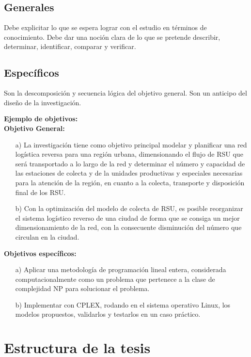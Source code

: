 \subsection{Generales}
Debe explicitar lo que se espera lograr con el estudio en términos de conocimiento. Debe dar una noción clara de lo que se pretende describir, determinar, identificar, comparar y verificar.


\subsection{Específicos}
Son la descomposición y secuencia lógica del objetivo general. Son un anticipo del diseño de la investigación.
\vskip 0.3cm



{\bf Ejemplo de objetivos:}\\
{\bf Objetivo General:}
\begin{enumerate}
\item[a)] La investigación tiene como objetivo principal modelar y planificar una red logística reversa para una región urbana, dimensionando el flujo de RSU que será transportado a lo largo de la red y determinar el número y capacidad de las estaciones de colecta y de la unidades productivas y especiales necesarias para la atención de la región, en cuanto a la colecta, transporte y disposición final de los RSU.
\vskip 0.3cm
\item[b)]Con la optimización del modelo de colecta de RSU, es posible reorganizar el sistema logístico reverso de una ciudad de forma que se consiga un mejor dimensionamiento de la red, con la consecuente disminución del número que circulan en la ciudad.
\end{enumerate}
\vskip 0.2cm
{\bf Objetivos específicos:}
\begin{enumerate}
\item[a)] Aplicar una metodología de programación lineal entera, considerada computacionalmente como un problema que pertenece a la clase de complejidad NP \citep{Korte} para solucionar el problema.
\item[b)] Implementar con CPLEX, rodando en el sistema operativo Linux, los modelos propuestos, validarlos y testarlos en un caso práctico.
\end{enumerate}




\section{Estructura de la tesis}

